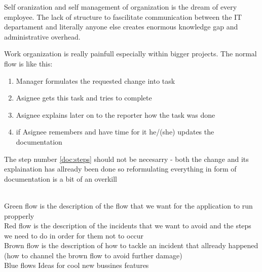 \documentclass[12pt,a4paper,twoside]{article}
\begin{document}
\label{customer}
\label{customer:1}
Self oranization and self management of organization is the dream of every employee. 
\label{customer:2}
The lack of structure to fascilitate communication between the IT departament and 
literally anyone else creates enormous knowledge gap and administrative overhead.
\label{customer:3}

\label{prob}
\label{prob:1}
Work organization is really painfull especially within bigger projects.
\label{prob:2}
The normal flow is like this:
\begin{enumerate}
  \item Manager formulates the requested change into task
  \item Asignee gets this task and tries to complete 
  \item Asignee explains later on to the reporter how the task was done
  \item if Asignee remembers and have time for it he/(she) updates the documentation\label{doc:steps}
\end{enumerate}
The step number \ref*{doc:steps} should not be necesarry - both the change and its explaination 
has allready been done so reformulating everything in form of documentation is a bit of an overkill

\label{sol}
\label{sol:1}
\secstarter
{}\label{sol:1:1}
\\Green flow is the description of the flow that we want for the application to run propperly
\label{sol:1:2}
\\Red flow is the description of the incidents that we want to avoid and the steps we need to do in order for them not to occur
\label{sol:1:3}
\\Brown flow is the description of how to tackle an incident that allready happened (how to channel the brown flow to avoid further damage)
\secend
{}\label{sol:2}
\secstarter
{}\label{sol:2:1}
\\Blue flows Ideas for cool new bussines features
\label{sol:2:2}
\secend

\label{uvp}
\label{uvp:1}
\end{document}
